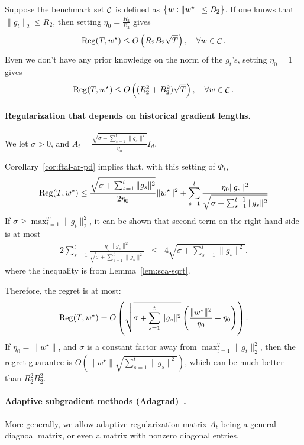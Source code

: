 \documentclass{article}
\DeclareMathOperator*{\Reg}{{\rm Reg}}
\DeclareMathOperator*{\Ccal}{{\cal C}}
\begin{document}
Suppose the benchmark set $\Ccal$ is defined as $\cbr{w: \| w^\star \| \leq B_2}$.
If one knows that $\| g_t \|_2 \leq R_2$, then setting $\eta_0 = \frac{R_2}{B_2}$ gives
\[ \Reg(T, w^\star) \leq O\del{R_2 B_2 \sqrt{T}}, \quad \forall w \in \Ccal. \]
Even we don't have any prior knowledge on the norm of the $g_t$'s, setting $\eta_0 = 1$ gives
\[ \Reg(T, w^\star) \leq O\del{(R_2^2 + B_2^2) \sqrt{T}}, \quad \forall w \in \Ccal. \]

\paragraph{Regularization that depends on historical gradient lengths.} We let $\sigma > 0$, and $A_t = \frac{\sqrt{\sigma + \sum_{s=1}^{t} \| g_s \|^2}}{\eta_0} I_d$.

Corollary~\ref{cor:ftal-ar-pd} implies that, with this setting of $\Phi_t$,
\[ \Reg(T, w^\star) \leq \frac{\sqrt{\sigma + \sum_{s=1}^{t} \| g_s \|^2}}{2 \eta_0} \| w^\star \|^2 + \sum_{s=1}^t \frac{\eta_0 \| g_s \|^2}{\sqrt{\sigma + \sum_{s=1}^{t-1} \| g_s \|^2}}\]
If $\sigma \geq \max_{t=1}^T \| g_t \|_2^2$, it can be shown that second term on the right hand side is at most
\begin{eqnarray*}
 2 \sum_{s=1}^t \frac{\eta_0 \| g_s \|^2}{\sqrt{\sigma + \sum_{s=1}^{t} \| g_s \|^2}}
&\leq& 4 \sqrt{\sigma + \sum_{s=1}^{t} \| g_s \|^2}.
\end{eqnarray*}
where the inequality is from Lemma~\ref{lem:sca-sqrt}.

Therefore, the regret is at most:
\begin{eqnarray*}
 \Reg(T, w^\star) = O\del{ \sqrt{\sigma + \sum_{s=1}^{t} \| g_s \|^2} \del{\frac{\|w^\star\|^2}{\eta_0} + \eta_0} }.
\end{eqnarray*}
If $\eta_0 = \| w^\star \|$, and $\sigma$ is a constant factor away from $\max_{t=1}^T \| g_t \|_2^2$, then the regret guarantee is $O(\|w^\star\| \sqrt{\sum_{s=1}^{t} \| g_s \|^2})$, which can be much better than $R_2^2 B_2^2$.


\paragraph{Adaptive subgradient methods (Adagrad)~\cite{duchi2011adaptive}.} More generally, we allow adaptive regularization matrix $A_t$ being a general diagnoal matrix, or even a matrix with nonzero diagonal entries.
\end{document}
